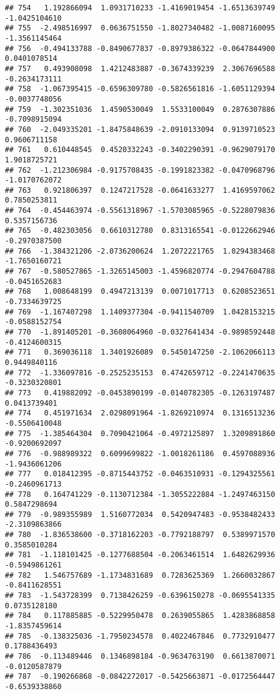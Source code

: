 \documentclass[
]{article}
\begin{document}
\begin{verbatim}
## 754   1.192866094  1.0931710233 -1.4169019454 -1.6513639749 -1.0425104610
## 755  -2.498516997  0.0636751550 -1.8027340482 -1.0087160095 -1.3561145464
## 756  -0.494133788 -0.8490677837 -0.8979386322 -0.0647844900  0.0401078514
## 757   0.493908098  1.4212483887 -0.3674339239  2.3067696588 -0.2634173111
## 758  -1.067395415 -0.6596309780 -0.5826561816 -1.6051129394 -0.0037748056
## 759  -1.302351036  1.4590530049  1.5533100049  0.2876307886 -0.7098915094
## 760  -2.049335201 -1.8475848639 -2.0910133094  0.9139710523  0.9606711158
## 761   0.610448545  0.4520332243 -0.3402290391 -0.9629079170  1.9018725721
## 762  -1.212306984 -0.9175708435 -0.1991823382 -0.0470968796 -1.0170762072
## 763   0.921806397  0.1247217528 -0.0641633277  1.4169597062  0.7850253811
## 764  -0.454463974 -0.5561318967 -1.5703085965 -0.5228079836  0.5357156736
## 765  -0.482303056  0.6610312780  0.8313165541 -0.0122662946 -0.2970387500
## 766  -1.384321206 -2.0736200624  1.2072221765  1.0294383468 -1.7650160721
## 767  -0.580527865 -1.3265145003 -1.4596820774 -0.2947604788 -0.0451652683
## 768   1.008648199  0.4947213139  0.0071017713  0.6208523651 -0.7334639725
## 769  -1.167407298  1.1409377304 -0.9411540709  1.0428153215 -0.0588152754
## 770  -1.891405201 -0.3608064960 -0.0327641434 -0.9898592448 -0.4124600315
## 771   0.369036118  1.3401926089  0.5450147250 -2.1062066113  0.9449840116
## 772  -1.336097816 -0.2525235153  0.4742659712 -0.2241470635 -0.3230320801
## 773   0.419882092 -0.0453890199 -0.0140782305 -0.1263197487  0.0413739401
## 774   0.451971634  2.0298091964 -1.8269210974  0.1316513236 -0.5506410048
## 775  -1.385464304  0.7090421064 -0.4972125897  1.3209891860 -0.9200692097
## 776  -0.988989322  0.6099699822 -1.0018261186  0.4597088936 -1.9436061206
## 777   0.018412395 -0.8715443752 -0.0463510931 -0.1294325561 -0.2460961713
## 778   0.164741229 -0.1130712384 -1.3055222884 -1.2497463150  0.5847298694
## 779  -0.989355989  1.5160772034  0.5420947483 -0.9538482433 -2.3109863866
## 780  -1.836538600 -0.3718162203 -0.7792188797  0.5389971570  0.3585010284
## 781  -1.118101425 -0.1277688504 -0.2063461514  1.6482629936 -0.5949861261
## 782   1.546757689 -1.1734831689  0.7283625369  1.2660032867 -0.8411628551
## 783  -1.543728399  0.7138426259 -0.6396150278 -0.0695541335  0.0735128180
## 784   0.117885885 -0.5229950478  0.2639055865  1.4283868858 -1.8357459614
## 785  -0.138325036 -1.7950234578  0.4022467846  0.7732910477  0.1788436493
## 786  -0.113489446  0.1346898184 -0.9634763190  0.6613870071 -0.0120587879
## 787  -0.190266868 -0.0842272017 -0.5425663871 -0.0172564447 -0.6539338860

\end{verbatim}
\end{document}
